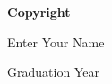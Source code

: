 
\newpage

\thispagestyle{empty}

\vspace*{1.5cm}

\begin{center}

{\bf \Huge Copyright}

\vspace{1cm}


   \Large Enter Your Name\\

   \vspace{0.5cm}


   Graduation Year\\

   \vspace{0.5cm}

\end{center}
